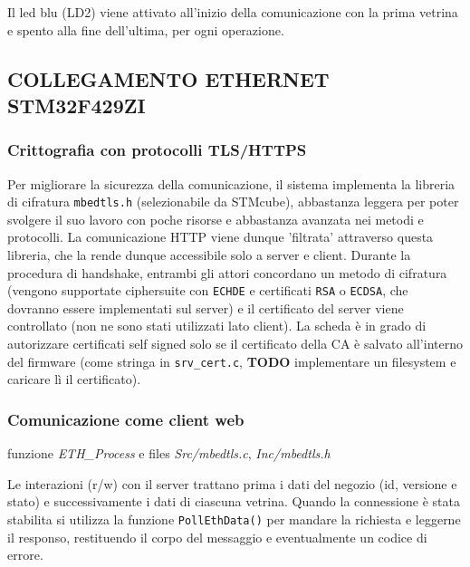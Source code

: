 Il led blu (LD2) viene attivato all'inizio della comunicazione con la prima vetrina e spento alla fine dell'ultima, per ogni operazione.

\subsection{COLLEGAMENTO ETHERNET STM32F429ZI}

\subsubsection{Crittografia con protocolli TLS/HTTPS}

Per migliorare la sicurezza della comunicazione, il sistema implementa la libreria di cifratura \texttt{mbedtls.h} (selezionabile da STMcube), abbastanza leggera per poter svolgere il suo lavoro con poche risorse e abbastanza avanzata nei metodi e protocolli. La comunicazione HTTP viene dunque 'filtrata' attraverso questa libreria, che la rende dunque accessibile solo a server e client. Durante la procedura di handshake, entrambi gli attori concordano un metodo di cifratura (vengono supportate ciphersuite con \texttt{ECHDE} e certificati \texttt{RSA} o \texttt{ECDSA}, che dovranno essere implementati sul server) e il certificato del server viene controllato (non ne sono stati utilizzati lato client). La scheda \`e in grado di autorizzare certificati self signed solo se il certificato della CA \`e salvato all'interno del firmware (come stringa in \texttt{srv\_cert.c}, \textbf{TODO} implementare un filesystem e caricare l\`i il certificato).

\subsubsection{Comunicazione come client web}

\textsf{funzione \textit{ETH\_Process} e files \textit{Src/mbedtls.c}, \textit{Inc/mbedtls.h}}

Le interazioni (r/w) con il server trattano prima i dati del negozio (id, versione e stato) e successivamente i dati di ciascuna vetrina. Quando la connessione \`e stata stabilita si utilizza la funzione \texttt{PollEthData()} per mandare la richiesta e leggerne il responso, restituendo il corpo del messaggio e eventualmente un codice di errore. 

